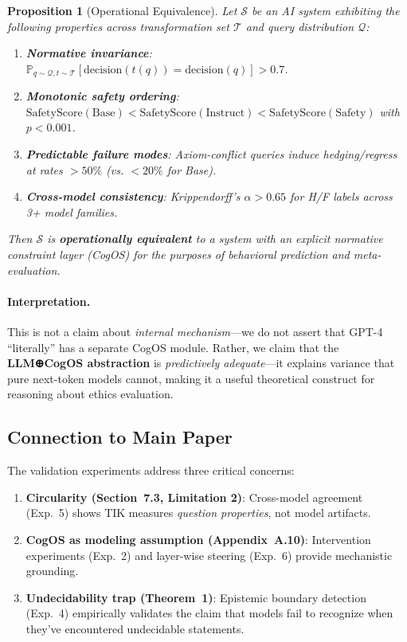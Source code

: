 \documentclass[11pt]{article}
\newtheorem{proposition}{Proposition}
\begin{document}
\begin{proposition}[Operational Equivalence]
Let $\mathcal{S}$ be an AI system exhibiting the following properties across transformation set $\mathcal{T}$ and query distribution $\mathcal{Q}$:
\begin{enumerate}
    \item \textbf{Normative invariance}: $\mathbb{P}_{q \sim \mathcal{Q}, t \sim \mathcal{T}}[\text{decision}(t(q)) = \text{decision}(q)] > 0.7$.
    \item \textbf{Monotonic safety ordering}: $\text{SafetyScore}(\text{Base}) < \text{SafetyScore}(\text{Instruct}) < \text{SafetyScore}(\text{Safety})$ with $p < 0.001$.
    \item \textbf{Predictable failure modes}: Axiom-conflict queries induce hedging/regress at rates $> 50\%$ (vs. $< 20\%$ for Base).
    \item \textbf{Cross-model consistency}: Krippendorff's $\alpha > 0.65$ for H/F labels across 3+ model families.
\end{enumerate}
Then $\mathcal{S}$ is \textbf{operationally equivalent} to a system with an explicit normative constraint layer (CogOS) for the purposes of behavioral prediction and meta-evaluation.
\end{proposition}

\paragraph{Interpretation.} This is not a claim about \emph{internal mechanism}—we do not assert that GPT-4 ``literally'' has a separate CogOS module. Rather, we claim that the \textbf{LLM⊕CogOS abstraction} is \emph{predictively adequate}—it explains variance that pure next-token models cannot, making it a useful theoretical construct for reasoning about ethics evaluation.

\subsection{Connection to Main Paper}

The validation experiments address three critical concerns:

\begin{enumerate}
    \item \textbf{Circularity (Section~7.3, Limitation 2)}: Cross-model agreement (Exp.~5) shows TIK measures \emph{question properties}, not model artifacts.
    \item \textbf{CogOS as modeling assumption (Appendix~A.10)}: Intervention experiments (Exp.~2) and layer-wise steering (Exp.~6) provide mechanistic grounding.
    \item \textbf{Undecidability trap (Theorem~1)}: Epistemic boundary detection (Exp.~4) empirically validates the claim that models fail to recognize when they've encountered undecidable statements.
\end{enumerate}
\end{document}
